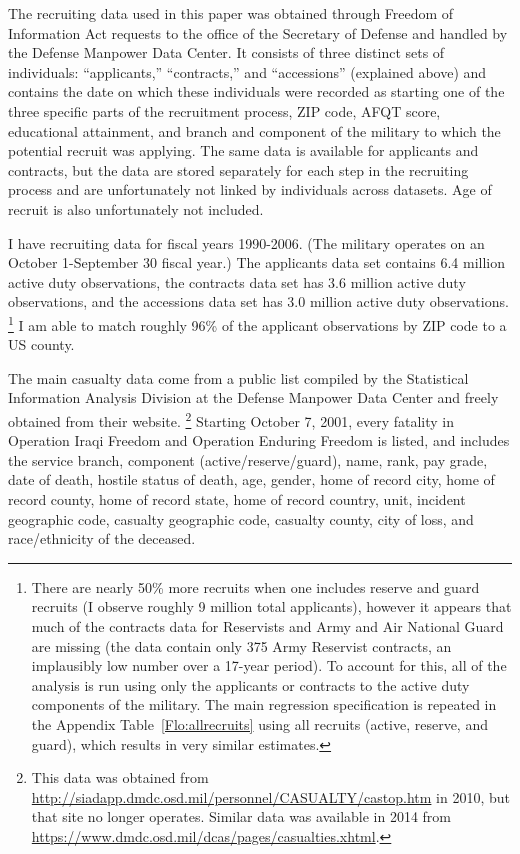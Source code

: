 \documentclass[12pt] {article}
\begin{document}
The recruiting data used in this paper was obtained through Freedom
of Information Act requests to the office of the Secretary of Defense
and handled by the Defense Manpower Data Center. It consists of three
distinct sets of individuals: {}``applicants,'' {}``contracts,''
and {}``accessions'' (explained above) and contains the date on
which these individuals were recorded as starting one of the three
specific parts of the recruitment process, ZIP code, AFQT score, educational
attainment, and branch and component of the military to which the
potential recruit was applying. The same data is available for applicants
and contracts, but the data are stored separately for each step in
the recruiting process and are unfortunately not linked by individuals
across datasets. Age of recruit is also unfortunately not included.

I have recruiting data for fiscal years 1990-2006. (The military operates
on an October 1-September 30 fiscal year.) The applicants data set
contains 6.4 million active duty observations, the contracts data
set has 3.6 million active duty observations, and the accessions data
set has 3.0 million active duty observations. \footnote{There are nearly 50\%
more recruits when one includes reserve and guard recruits (I
observe roughly 9 million total applicants), however it appears that
much of the contracts data for Reservists and Army and Air National
Guard are missing (the data contain only 375 Army Reservist contracts,
an implausibly low number over a 17-year period). To account for this,
all of the analysis is run using only the applicants or contracts
to the active duty components of the military. The main regression specification is repeated in the Appendix Table~\ref{Flo:allrecruits} using all recruits (active, reserve, and guard), which results in very similar estimates.} I am able to match roughly 96\% of the applicant observations by ZIP code to a US county.


The main casualty data come from a public list compiled by the Statistical
Information Analysis Division at the Defense Manpower Data Center
and freely obtained from their website. \footnote{This data was obtained from  \url{http://siadapp.dmdc.osd.mil/personnel/CASUALTY/castop.htm} in 2010, but that site no longer operates. Similar data was available in 2014 from \url{https://www.dmdc.osd.mil/dcas/pages/casualties.xhtml}.}
Starting October 7, 2001, every fatality in Operation Iraqi Freedom
and Operation Enduring Freedom is listed, and includes
the service branch, component (active/reserve/guard), name, rank,
pay grade, date of death, hostile status of death, age, gender, home
of record city, home of record county, home of record state, home
of record country, unit, incident geographic code, casualty geographic
code, casualty county, city of loss, and race/ethnicity of the deceased.
\end{document}
